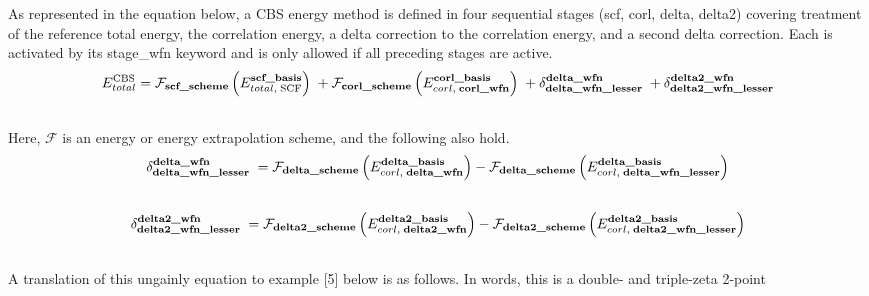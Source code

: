 \documentclass[letterpaper,10pt,english]{sphinxmanual}
\begin{document}
\begin{fulllineitems}
As represented in the equation below, a CBS energy method is defined in four
sequential stages (scf, corl, delta, delta2) covering treatment of the
reference total energy, the correlation energy, a delta correction to the
correlation energy, and a second delta correction. Each is activated by its
stage\_wfn keyword and is only allowed if all preceding stages are active.
\begin{gather}
\begin{split}E_{total}^{\text{CBS}} = \mathcal{F}_{\textbf{scf\_scheme}} \left(E_{total,\; \text{SCF}}^{\textbf{scf\_basis}}\right) \; + \mathcal{F}_{\textbf{corl\_scheme}} \left(E_{corl,\; \textbf{corl\_wfn}}^{\textbf{corl\_basis}}\right) \; + \delta_{\textbf{delta\_wfn\_lesser}}^{\textbf{delta\_wfn}} \; + \delta_{\textbf{delta2\_wfn\_lesser}}^{\textbf{delta2\_wfn}}\end{split}\notag\\\begin{split}\end{split}\notag
\end{gather}
Here, $\mathcal{F}$ is an energy or energy extrapolation scheme, and the following also hold.
\begin{gather}
\begin{split}\delta_{\textbf{delta\_wfn\_lesser}}^{\textbf{delta\_wfn}} \; = \mathcal{F}_{\textbf{delta\_scheme}} \left(E_{corl,\; \textbf{delta\_wfn}}^{\textbf{delta\_basis}}\right) - \mathcal{F}_{\textbf{delta\_scheme}} \left(E_{corl,\; \textbf{delta\_wfn\_lesser}}^{\textbf{delta\_basis}}\right)\end{split}\notag\\\begin{split}\end{split}\notag
\end{gather}\begin{gather}
\begin{split}\delta_{\textbf{delta2\_wfn\_lesser}}^{\textbf{delta2\_wfn}} \; = \mathcal{F}_{\textbf{delta2\_scheme}} \left(E_{corl,\; \textbf{delta2\_wfn}}^{\textbf{delta2\_basis}}\right) - \mathcal{F}_{\textbf{delta2\_scheme}} \left(E_{corl,\; \textbf{delta2\_wfn\_lesser}}^{\textbf{delta2\_basis}}\right)\end{split}\notag\\\begin{split}\end{split}\notag
\end{gather}
A translation of this ungainly equation to example {[}5{]} below is as
follows. In words, this is a double- and triple-zeta 2-point

\end{fulllineitems}
\end{document}
